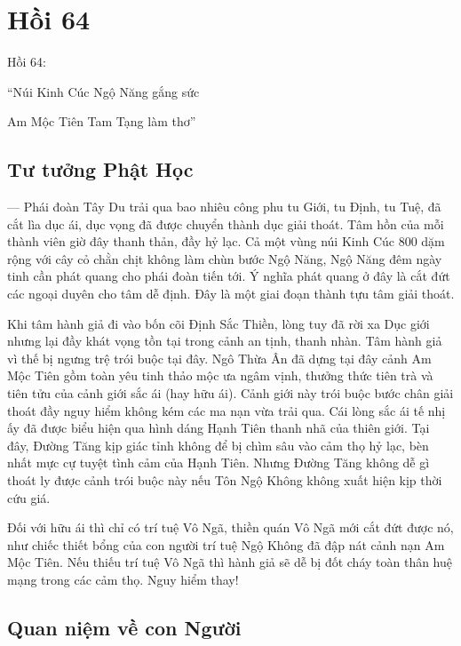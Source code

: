 \chapter{Hồi 64} %
\label{cha:hoi_64}

Hồi 64:

\begin{itshape}
``Núi Kinh Cúc Ngộ Năng gắng sức

Am Mộc Tiên Tam Tạng làm thơ''
\end{itshape}

\section{Tư tưởng Phật Học} %
\label{sec:64_phat_hoc}

— Phái đoàn Tây Du trải qua bao nhiêu công phu tu Giới, tu Định, tu Tuệ, đã cắt lìa dục ái, dục vọng đã được chuyển thành dục giải thoát. Tâm hồn của mỗi thành viên giờ đây thanh thản, đầy hỷ lạc. Cả một vùng núi Kinh Cúc 800 dặm rộng với cây cỏ chằn chịt không làm chùn bước Ngộ Năng, Ngộ Năng đêm ngày tinh cần phát quang cho phái đoàn tiến tới. Ý nghĩa phát quang ở đây là cắt đứt các ngoại duyên cho tâm dễ định. Đây là một giai đoạn thành tựu tâm giải thoát.

Khi tâm hành giả đi vào bốn cõi Định Sắc Thiền, lòng tuy đã rời xa Dục giới nhưng lại đầy khát vọng tồn tại trong cảnh an tịnh, thanh nhàn. Tâm hành giả vì thế bị ngưng trệ trói buộc tại đây. Ngô Thừa Ân đã dựng tại đây cảnh Am Mộc Tiên gồm toàn yêu tinh thảo mộc ưa ngâm vịnh, thưởng thức tiên trà và tiên tửu của cảnh giới sắc ái (hay hữu ái). Cảnh giới này trói buộc bước chân giải thoát đầy nguy hiểm không kém các ma nạn vừa trải qua. Cái lòng sắc ái tế nhị ấy đã được biểu hiện qua hình dáng Hạnh Tiên thanh nhã của thiên giới. Tại đây, Đường Tăng kịp giác tỉnh không để bị chìm sâu vào cảm thọ hỷ lạc, bèn nhất mực cự tuyệt tình cảm của Hạnh Tiên. Nhưng Đường Tăng không dễ gì thoát ly được cảnh trói buộc này nếu Tôn Ngộ Không không xuất hiện kịp thời cứu giá.

Đối với hữu ái thì chỉ có trí tuệ Vô Ngã, thiền quán Vô Ngã mới cắt đứt được nó, như chiếc thiết bổng của con người trí tuệ Ngộ Không đã đập nát cảnh nạn Am Mộc Tiên. Nếu thiếu trí tuệ Vô Ngã thì hành giả sẽ dễ bị đốt cháy toàn thân huệ mạng trong các cảm thọ. Nguy hiểm thay!

\section{Quan niệm về con Người} %
\label{sec:64_con_nguoi}

